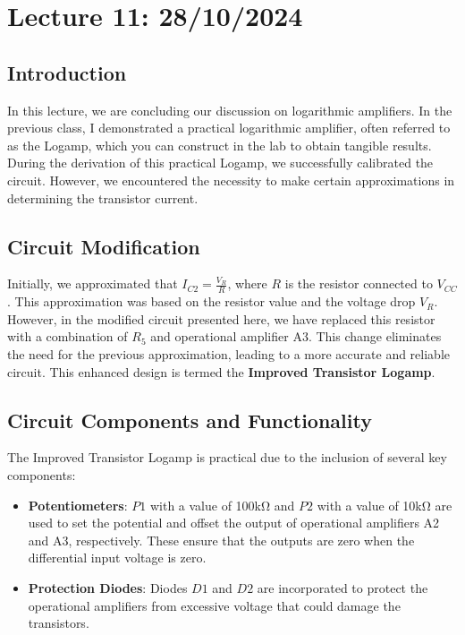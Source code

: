 \documentclass[a4paper,9pt,twoside,openany,twocolumn]{memoir}
\begin{document}
\section*{Lecture 11: 28/10/2024}

\subsection{Introduction}
In this lecture, we are concluding our discussion on logarithmic amplifiers. In the previous class, I demonstrated a practical logarithmic amplifier, often referred to as the Logamp, which you can construct in the lab to obtain tangible results. During the derivation of this practical Logamp, we successfully calibrated the circuit. However, we encountered the necessity to make certain approximations in determining the transistor current.

\subsection{Circuit Modification}
Initially, we approximated that \( I_{C2} = \frac{V_R}{R} \), where \( R \) is the resistor connected to \( V_{CC} \). This approximation was based on the resistor value and the voltage drop \( V_R \). However, in the modified circuit presented here, we have replaced this resistor with a combination of \( R_5 \) and operational amplifier A3. This change eliminates the need for the previous approximation, leading to a more accurate and reliable circuit. This enhanced design is termed the \textbf{Improved Transistor Logamp}.

\subsection{Circuit Components and Functionality}
The Improved Transistor Logamp is practical due to the inclusion of several key components:
\begin{itemize}
    \item \textbf{Potentiometers}: \( P1 \) with a value of 100kΩ and \( P2 \) with a value of 10kΩ are used to set the potential and offset the output of operational amplifiers A2 and A3, respectively. These ensure that the outputs are zero when the differential input voltage is zero.
    \item \textbf{Protection Diodes}: Diodes \( D1 \) and \( D2 \) are incorporated to protect the operational amplifiers from excessive voltage that could damage the transistors.
\end{itemize}
\end{document}
